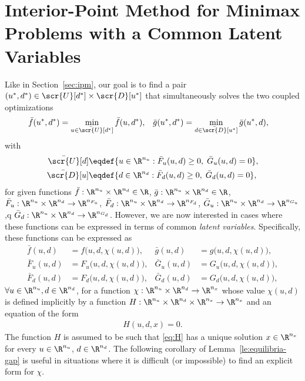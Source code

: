 \documentclass[11pt]{article}
\begin{document}
\section{Interior-Point Method for Minimax Problems with a Common Latent Variables}
\label{sec:ipm-latent}

Like in Section~\ref{sec:ipm}, our goal is to find a pair
$(u^*,d^*)\in\scr{U}[d^*]\times\scr{D}[u^*]$ that simultaneously solves the
two coupled optimizations
\begin{align}\label{eq:equilibria-bar}
  \bar f(u^*,d^*)&=\min_{u\in\bar{\scr{U}}[d^*]} \bar f(u,d^*), &
  \bar g(u^*,d^*)&=\min_{d\in\bar{\scr{D}}[u^*]} \bar g(u^*,d),
\end{align}
with
\begin{subequations}
  \label{eq:U-D-bar}
  \begin{align}
    \bar{\scr{U}}[d]&\eqdef\{u\in\R^{n_u}: \bar F_u(u,d)\ge 0,\; \bar G_u(u,d)=0\}, \\
    \bar{\scr{D}}[u]&\eqdef\{d\in\R^{n_d}: \bar F_d(u,d)\ge 0,\; \bar G_d(u,d)=0\},
  \end{align}
\end{subequations}
for given functions $\bar f:\R^{n_u}\times\R^{n_d}\in\R$, $\bar
g:\R^{n_u}\times\R^{n_d}\in\R$, $\bar F_u:\R^{n_u}\times\R^{n_d}\to\R^{n_{F_u}}$, $\bar
F_d:\R^{n_u}\times\R^{n_d}\to\R^{n_{F_d}}$, $\bar G_u:\R^{n_u}\times\R^{n_d}\to\R^{n_{G_u}}$,q
$\bar G_d:\R^{n_u}\times\R^{n_d}\to\R^{n_{G_d}}$. However, we are now interested in
cases where these functions can be expressed in terms of common
\emph{latent variables}. Specifically, these functions can be
expressed as
\begin{align*}
  \bar f(u,d)&=f\big(u,d,\chi(u,d)\big), &
  \bar g(u,d)&=g\big(u,d,\chi(u,d)\big), \\
  \bar F_u(u,d)&=F_u\big(u,d,\chi(u,d)\big), &
  \bar G_u(u,d)&=G_u\big(u,d,\chi(u,d)\big), \\
  \bar F_d(u,d)&=F_d\big(u,d,\chi(u,d)\big), & \bar
  G_d(u,d)&=G_d\big(u,d,\chi(u,d)\big),
\end{align*}
$\forall u\in\R^{n_u},d\in\R^{n_d}$, for a function
$\chi:\R^{n_u}\times\R^{n_d}\to\R^{n_x}$ whose value $\chi(u,d)$ is defined implicitly
by a function
$H:\R^{n_u}\times\R^{n_d}\times\R^{n_x}\to\R^{n_x}$ and an equation of the form
\begin{align}\label{eq:H}
  H(u,d,x)=0.
\end{align}
The function $H$ is assumed to be such that \eqref{eq:H} has a unique
solution $x\in\R^{n_x}$ for every $u\in\R^{n_u}$, $d\in\R^{n_d}$. The following
corollary of Lemma~\ref{le:equilibria-gap} is useful in situations
where it is difficult (or impossible) to find an explicit form for
$\chi$.
\end{document}
